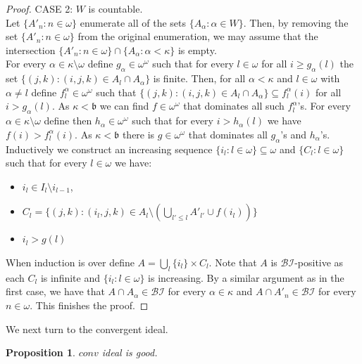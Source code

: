 \documentclass[a4paper]{amsart}
\newtheorem{proposition}[theorem]{Proposition}
\newcommand{\bbb}{\mathfrak{b}}
\newcommand{\Baire}{\omega^{\omega}}
\newcommand{\conv}{conv}
\newcommand{\BI}{\mathcal{BI}}
\begin{document}
\begin{proof}
    CASE 2: $W$ is countable.\\
    Let $\{A'_{n}:n\in\omega\}$ enumerate all of the sets $\{A_{\alpha}:\alpha\in W\}$. Then, by removing the set $\{A'_{n}:n\in\omega\}$ from the original enumeration, we may assume that the intersection $\{A'_{n}:n\in\omega\}\cap\{A_{\alpha}:\alpha<\kappa\}$ is empty.\\
    For every $\alpha\in\kappa\setminus\omega$ define $g_{\alpha}\in\Baire$ such that for every $l\in\omega$ for all $i\geq g_{\alpha}(l)$ the set $\{(j,k):(i,j,k)\in A_{l}\cap A_{\alpha}\}$ is finite. Then, for all $\alpha<\kappa$ and $l\in\omega$ with $\alpha\neq l$ define $f^{\alpha}_{l}\in\Baire$ such that $\{(j,k):(i,j,k)\in A_{l}\cap A_{\alpha}\}\subseteq f^{\alpha}_{l}(i)$ for all $i>g_{\alpha}(l)$.
    As $\kappa<\bbb$ we can find $f\in\Baire$ that dominates all such $f^{\alpha}_{l}$'s.
    For every $\alpha\in\kappa\setminus\omega$ define then $h_{\alpha}\in\Baire$ such that for every $i>h_{\alpha}(l)$ we have $f(i)>f^{\alpha}_{l}(i)$. As $\kappa<\bbb$ there is $g\in\Baire$ that dominates all $g_{\alpha}$'s and $h_{\alpha}$'s.\\
    Inductively we construct an increasing sequence $\{i_{l}:l\in\omega\}\subseteq\omega$ and $\{C_{l}:l\in\omega\}$ such that for every $l\in\omega$ we have:
    \begin{itemize}
        \item[--] $i_{l}\in I_{l}\setminus i_{l-1}$,
        \item[--] $C_{l}=\{(j,k):(i_{l},j,k)\in A_{l}\setminus(\bigcup_{l'\leq l}A'_{l'}\cup f(i_{l}))\}$
        \item[--] $i_{l}>g(l)$
    \end{itemize}
    When induction is over define $A=\bigcup_{l}\{i_{l}\}\times C_{l}$. Note that $A$ is $\BI$-positive as each $C_{l}$ is infinite and $\{i_{l}:l\in\omega\}$ is increasing. By a similar argument as in the first case, we have that $A\cap A_{\alpha}\in\BI$ for every $\alpha\in\kappa$ and $A\cap A'_{n}\in\BI$ for every $n\in\omega$. This finishes the proof.
\end{proof}
We next turn to the convergent ideal.
\begin{proposition}
    $\conv$ ideal is good.
\end{proposition}
\end{document}
